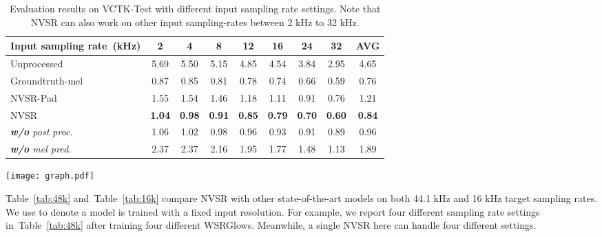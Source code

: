 \documentclass[a4paper]{article}
\def\Tabref#1{Table~\ref{#1}}
\begin{document}
\begin{table*}[htbp]
\begin{minipage}{0.65\textwidth}
\caption{Evaluation results on VCTK-Test with different input sampling rate settings. Note that NVSR can also work on other input sampling-rates between 2 kHz to 32 kHz.}
\label{table:main_result}
\begin{tabular}{@{}lcccccccc@{}}
\toprule
Input sampling rate~(kHz)                & 2 & 4 & 8 & 12 & 16 & 24 & 32 & AVG  \\ \midrule
Unprocessed          & 5.69 & 5.50 & 5.15 & 4.85  & 4.54  & 3.84  & 2.95  & 4.65 \\
Groundtruth-mel & 0.87 & 0.85 & 0.81 & 0.78  & 0.74  & 0.66  & 0.59  & 0.76 \\ \midrule
NVSR-Pad        & 1.55 & 1.54 & 1.46 & 1.18  & 1.11  & 0.91  & 0.76  & 1.21 \\
NVSR & \textbf{1.04} & \textbf{0.98} & \textbf{0.91} & \textbf{0.85}  & \textbf{0.79}  & \textbf{0.70}  & \textbf{0.60}  & \textbf{0.84} \\
\textit{\textbf{w/o} post proc.}       & 1.06 & 1.02 & 0.98 & 0.96  & 0.93  & 0.91  & 0.89  & 0.96 \\
\textit{\textbf{w/o} mel pred.}   & 2.37 & 2.37 & 2.16 & 1.95  & 1.77  & 1.48  & 1.13  & 1.89 \\ \bottomrule
\end{tabular}
\end{minipage}\hfill
\begin{minipage}{0.30\textwidth}
\texttt{[image: graph.pdf]}
\label{fig-visualization_of_table}
\end{minipage}
\vspace{-1em}
\end{table*}

\Tabref{tab:48k} and~\Tabref{tab:16k} compare NVSR with other state-of-the-art models on both 44.1 kHz and 16 kHz target sampling rates. We use  to denote a model is trained with a fixed input resolution. For example, we report four different sampling rate settings in~\Tabref{tab:48k} after training four different WSRGlows. Meanwhile, a single NVSR here can handle four different settings.
\end{document}
